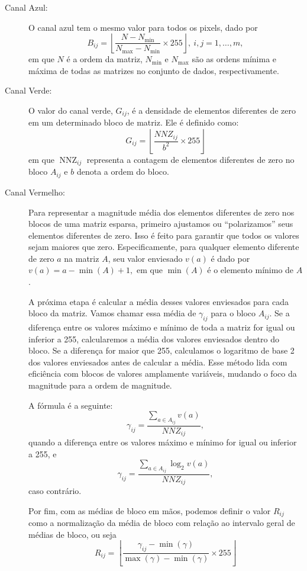 \documentclass{pssbmac}
\begin{document}
\begin{description}
	\item[Canal Azul:] O canal azul tem o mesmo valor para todos os pixels, dado por
	$$B_{ij} = \left\lfloor\frac{N - N_{\min}}{N_{\max}  - N_{\min}}\times 255\right\rfloor,~i,j=1,\ldots,m,$$
	em que $N$ é a ordem da matriz, $N_{\min}$ e $N_{\max}$ são as ordens mínima e máxima de todas as matrizes 
    no conjunto de dados, respectivamente.
	
	\item[Canal Verde:] O valor do canal verde, \( G_{ij} \), é a densidade de elementos diferentes de zero 
    em um determinado bloco de matriz. Ele é definido como:
\[ G_{ij} = \left\lfloor\frac{NNZ_{ij}}{b^{2}}\times 255\right\rfloor \]
em que \( \operatorname{NNZ}_{ij} \) representa a contagem de elementos diferentes de zero no bloco
\( A_{ij} \) e \( b \) denota a ordem do bloco.

	\item[Canal Vermelho:] Para representar a magnitude média dos elementos diferentes de zero 
    nos blocos de uma matriz esparsa, primeiro ajustamos ou “polarizamos” seus elementos diferentes de zero.  
    Isso é feito para garantir que todos os valores sejam maiores que zero. Especificamente, 
    para qualquer elemento diferente de zero \(a\) na matriz \(A\), seu valor enviesado 
    \(v(a)\) é dado por $v(a) = a - \min(A) + 1,$ em que $\min(A)$ é o elemento mínimo de $A$.

A próxima etapa é calcular a média desses valores enviesados para cada bloco da matriz. 
Vamos chamar essa média de \( \gamma_{ij} \) para o bloco \(A_{ij}\). Se a diferença entre os valores 
máximo e mínimo de toda a matriz for igual ou inferior a 255, calcularemos a média dos valores enviesados
dentro do bloco. Se a diferença for maior que 255, calculamos o logaritmo de base 2 dos valores enviesados
antes de calcular a média. Esse método lida com eficiência com blocos de valores amplamente variáveis, 
mudando o foco da magnitude para a ordem de magnitude.

A fórmula é a seguinte:
\[\gamma_{ij} = \frac{\sum_{a \in A_{ij}} v(a)}{NNZ_{ij}},\]
quando a diferença entre os valores máximo e mínimo for igual ou inferior a 255, e 
\[\gamma_{ij} = \frac{\sum_{a \in A_{ij}} \log_2 v(a)}{NNZ_{ij}},\]
caso contrário.

Por fim, com as médias de bloco em mãos, podemos definir o valor $R_{ij}$ como a 
normalização da média de bloco com relação ao intervalo geral de médias de bloco, ou seja 
\[R_{ij} = \left\lfloor \frac{\gamma_{ij} - \min(\gamma)} {\max(\gamma) - \min(\gamma)} \times 255 \right\rfloor\]
\end{description}
\end{document}
